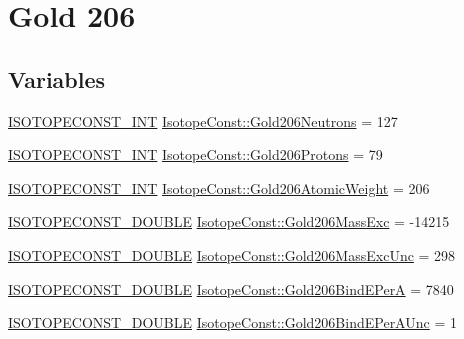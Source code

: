 \hypertarget{group___isotope_const-_gold-_au206}{}\section{Gold 206}
\label{group___isotope_const-_gold-_au206}
\subsection*{Variables}
\begin{DoxyCompactItemize}
\item 
\mbox{\hyperlink{group___isotope_const-_macros_ga5f18360b3e99483a35c32d789e62621c}{I\+S\+O\+T\+O\+P\+E\+C\+O\+N\+S\+T\+\_\+\+I\+NT}} \mbox{\hyperlink{group___isotope_const-_gold-_au206_gaff7f958833bca7bd1ca14e9f0459f863}{Isotope\+Const\+::\+Gold206\+Neutrons}} = 127
\item 
\mbox{\hyperlink{group___isotope_const-_macros_ga5f18360b3e99483a35c32d789e62621c}{I\+S\+O\+T\+O\+P\+E\+C\+O\+N\+S\+T\+\_\+\+I\+NT}} \mbox{\hyperlink{group___isotope_const-_gold-_au206_ga019b978c56895a4e5b6892564283566d}{Isotope\+Const\+::\+Gold206\+Protons}} = 79
\item 
\mbox{\hyperlink{group___isotope_const-_macros_ga5f18360b3e99483a35c32d789e62621c}{I\+S\+O\+T\+O\+P\+E\+C\+O\+N\+S\+T\+\_\+\+I\+NT}} \mbox{\hyperlink{group___isotope_const-_gold-_au206_ga5974a8b2daffa0a444a306b5ebf6af54}{Isotope\+Const\+::\+Gold206\+Atomic\+Weight}} = 206
\item 
\mbox{\hyperlink{group___isotope_const-_macros_ga8f45a7272ce02c0b4c65c44636ed719a}{I\+S\+O\+T\+O\+P\+E\+C\+O\+N\+S\+T\+\_\+\+D\+O\+U\+B\+LE}} \mbox{\hyperlink{group___isotope_const-_gold-_au206_ga623f564958b9354f843490c49617bfc9}{Isotope\+Const\+::\+Gold206\+Mass\+Exc}} = -\/14215
\item 
\mbox{\hyperlink{group___isotope_const-_macros_ga8f45a7272ce02c0b4c65c44636ed719a}{I\+S\+O\+T\+O\+P\+E\+C\+O\+N\+S\+T\+\_\+\+D\+O\+U\+B\+LE}} \mbox{\hyperlink{group___isotope_const-_gold-_au206_gaf1977bc071d44d64c8d7f897307bb684}{Isotope\+Const\+::\+Gold206\+Mass\+Exc\+Unc}} = 298
\item 
\mbox{\hyperlink{group___isotope_const-_macros_ga8f45a7272ce02c0b4c65c44636ed719a}{I\+S\+O\+T\+O\+P\+E\+C\+O\+N\+S\+T\+\_\+\+D\+O\+U\+B\+LE}} \mbox{\hyperlink{group___isotope_const-_gold-_au206_gace664983be40fb407f30b205c0a3a840}{Isotope\+Const\+::\+Gold206\+Bind\+E\+PerA}} = 7840
\item 
\mbox{\hyperlink{group___isotope_const-_macros_ga8f45a7272ce02c0b4c65c44636ed719a}{I\+S\+O\+T\+O\+P\+E\+C\+O\+N\+S\+T\+\_\+\+D\+O\+U\+B\+LE}} \mbox{\hyperlink{group___isotope_const-_gold-_au206_ga02b6ce346a30522d9a859fc96b7be411}{Isotope\+Const\+::\+Gold206\+Bind\+E\+Per\+A\+Unc}} = 1

\end{DoxyCompactItemize}
